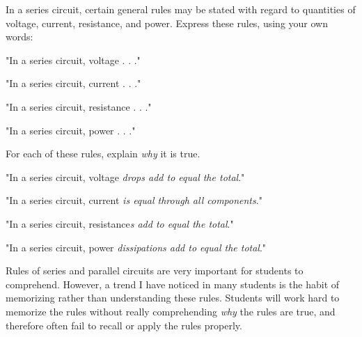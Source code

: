 

In a series circuit, certain general rules may be stated with regard to quantities of voltage, current, resistance, and power.  Express these rules, using your own words:

\vskip 10pt

\noindent
"In a series circuit, voltage . . ."

\vskip 10pt

\noindent
"In a series circuit, current . . ."

\vskip 10pt

\noindent
"In a series circuit, resistance . . ."

\vskip 10pt

\noindent
"In a series circuit, power . . ."

\vskip 10pt

For each of these rules, explain {\it why} it is true.







\noindent
"In a series circuit, voltage {\it drops add to equal the total}."

\vskip 10pt

\noindent
"In a series circuit, current {\it is equal through all components}."

\vskip 10pt

\noindent
"In a series circuit, resistance{\it s add to equal the total}."

\vskip 10pt

\noindent
"In a series circuit, power {\it dissipations add to equal the total}."







Rules of series and parallel circuits are very important for students to comprehend.  However, a trend I have noticed in many students is the habit of memorizing rather than understanding these rules.  Students will work hard to memorize the rules without really comprehending {\it why} the rules are true, and therefore often fail to recall or apply the rules properly.

